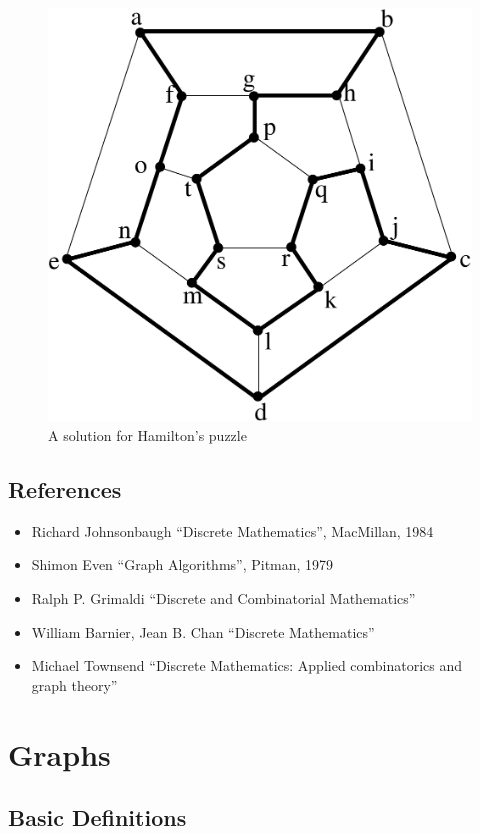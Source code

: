 \begin{figure}[ht]
	\centering
	\includegraphics[width=0.6\linewidth,keepaspectratio]{hamiltonkring}
	\caption{A solution for Hamilton's puzzle
	\label{hamiltonkring}}
\end{figure}

\section{References}

\begin{itemize}
\item
Richard Johnsonbaugh ``Discrete Mathematics'', MacMillan, 1984
\item
Shimon Even ``Graph Algorithms'', Pitman, 1979
\item
Ralph P. Grimaldi ``Discrete and Combinatorial Mathematics''
\item
William Barnier, Jean B. Chan ``Discrete Mathematics''
\item
Michael Townsend ``Discrete Mathematics: Applied combinatorics and \\
graph theory''
\end{itemize}



\chapter{Graphs}

\section{Basic Definitions}


